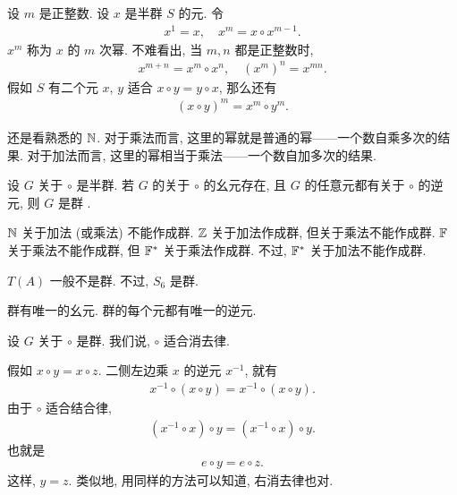 \begin{definition}
    设 $m$ 是正整数. 设 $x$ 是半群 $S$ 的元. 令
    \begin{align*}
        x^{1} = x, \quad x^{m} = x \circ x^{m-1}.
    \end{align*}
    $x^{m}$ 称为 $x$ 的 $m$ 次幂. 不难看出, 当 $m,n$ 都是正整数时,
    \begin{align*}
        x^{m+n} = x^m \circ x^n, \quad (x^m)^n = x^{mn}.
    \end{align*}
    假如 $S$ 有二个元 $x$, $y$ 适合 $x \circ y = y \circ x$, 那么还有
    \begin{align*}
        (x \circ y)^m = x^m \circ y^m.
    \end{align*}
\end{definition}

\begin{example}
    还是看熟悉的 $\mathbb{N}$. 对于乘法而言, 这里的幂就是普通的幂——一个数自乘多次的结果. 对于加法而言, 这里的幂相当于乘法——一个数自加多次的结果.
\end{example}

\begin{definition}
    设 $G$ 关于 $\circ$ 是半群. 若 $G$ 的关于 $\circ$ 的幺元存在, 且 $G$ 的任意元都有关于 $\circ$ 的逆元, 则 $G$ 是群 .
\end{definition}

\begin{example}
    $\mathbb{N}$ 关于加法 (或乘法) 不能作成群. $\mathbb{Z}$ 关于加法作成群, 但关于乘法不能作成群. $\mathbb{F}$ 关于乘法不能作成群, 但 $\mathbb{F}^{\ast}$ 关于乘法作成群. 不过, $\mathbb{F}^{\ast}$ 关于加法不能作成群.
\end{example}

\begin{example}
    $T(A)$ 一般不是群. 不过, $S_6$ 是群.
\end{example}

\begin{remark}
    群有唯一的幺元. 群的每个元都有唯一的逆元.
\end{remark}

\begin{remark}
    设 $G$ 关于 $\circ$ 是群. 我们说, $\circ$ 适合消去律.

    假如 $x \circ y = x \circ z$. 二侧左边乘 $x$ 的逆元 $x^{-1}$, 就有
    \begin{align*}
        x^{-1} \circ (x \circ y) = x^{-1} \circ (x \circ y).
    \end{align*}
    由于 $\circ$ 适合结合律,
    \begin{align*}
        (x^{-1} \circ x) \circ y = (x^{-1} \circ x) \circ y.
    \end{align*}
    也就是
    \begin{align*}
        e \circ y = e \circ z.
    \end{align*}
    这样, $y = z$. 类似地, 用同样的方法可以知道, 右消去律也对.
\end{remark}

